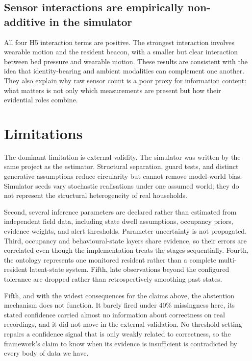\documentclass[11pt]{article}
\begin{document}
\subsection{Sensor interactions are empirically non-additive in the simulator}

All four H5 interaction terms are positive. The strongest interaction involves wearable motion and the resident beacon, with a smaller but clear interaction between bed pressure and wearable motion. These results are consistent with the idea that identity-bearing and ambient modalities can complement one another. They also explain why raw sensor count is a poor proxy for information content: what matters is not only which measurements are present but how their evidential roles combine.

\section{Limitations}
\label{sec:limitations}

The dominant limitation is external validity. The simulator was written by the same project as the estimator. Structural separation, guard tests, and distinct generative assumptions reduce circularity but cannot remove model-world bias. Simulator seeds vary stochastic realisations under one assumed world; they do not represent the structural heterogeneity of real households.

Second, several inference parameters are declared rather than estimated from independent field data, including state dwell assumptions, occupancy priors, evidence weights, and alert thresholds. Parameter uncertainty is not propagated. Third, occupancy and behavioural-state layers share evidence, so their errors are correlated even though the implementation treats the stages sequentially. Fourth, the ontology represents one monitored resident rather than a complete multi-resident latent-state system. Fifth, late observations beyond the configured tolerance are dropped rather than retrospectively smoothing past states.

Fifth, and with the widest consequences for the claims above, the abstention mechanism does not function. It barely fired under 40\% missingness here, its stated confidence carried almost no information about correctness on real recordings, and it did not move in the external validation. No threshold setting repairs a confidence signal that is only weakly related to correctness, so the framework's claim to know when its evidence is insufficient is contradicted by every body of data we have.
\end{document}
